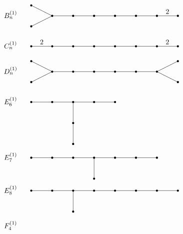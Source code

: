 \documentclass[letterpaper]{amsart}
\numberwithin{equation}{section}
\theoremstyle{definition}
\begin{document}
\begin{figure}[ht] 
\[ 
\begin{array}{ccl} 
B_n^{(1)} 
&& 
\setlength{\unitlength}{1.5pt} 
\begin{picture}(140,15)(0,-2) 
\put(20,0){\line(1,0){120}} 
\put(0,10){\line(2,-1){20}} 
\put(0,-10){\line(2,1){20}} 
\multiput(20,0)(20,0){7}{\circle*{2}} 
\put(0,10){\circle*{2}} 
\put(0,-10){\circle*{2}} 
\put(130,4){\makebox(0,0){$2$}} 
\end{picture} 
\\[.2in] 
C_n^{(1)}%
&& 
\setlength{\unitlength}{1.5pt} 
\begin{picture}(140,17)(0,-2) 
\put(0,0){\line(1,0){140}} 
\multiput(0,0)(20,0){8}{\circle*{2}} 
\put(10,4){\makebox(0,0){$2$}} 
\put(130,4){\makebox(0,0){$2$}} 
\end{picture} 
\\[.1in] 
D_n^{(1)} 
&& 
\setlength{\unitlength}{1.5pt} 
\begin{picture}(140,17)(0,-2) 
\put(20,0){\line(1,0){100}} 
\put(0,10){\line(2,-1){20}} 
\put(0,-10){\line(2,1){20}} 
\put(120,0){\line(2,-1){20}} 
\put(120,0){\line(2,1){20}} 
\multiput(20,0)(20,0){6}{\circle*{2}} 
\put(0,10){\circle*{2}} 
\put(0,-10){\circle*{2}} 
\put(140,10){\circle*{2}} 
\put(140,-10){\circle*{2}} 
\end{picture} 
\\[.2in] 
E_6^{(1)} 
&& 
\setlength{\unitlength}{1.5pt} 
\begin{picture}(140,17)(0,-2) 
\put(0,0){\line(1,0){80}} 
\put(40,0){\line(0,-1){40}} 
\put(40,-20){\circle*{2}} 
\put(40,-40){\circle*{2}} 
\multiput(0,0)(20,0){5}{\circle*{2}} 
\end{picture} 
\\[.7in] 
E_7^{(1)} 
&& 
\setlength{\unitlength}{1.5pt} 
\begin{picture}(140,17)(0,-2) 
\put(0,0){\line(1,0){120}} 
\put(60,0){\line(0,-1){20}} 
\put(60,-20){\circle*{2}} 
\multiput(0,0)(20,0){7}{\circle*{2}} 
\end{picture} 
\\[.25in] 
E_8^{(1)} 
&& 
\setlength{\unitlength}{1.5pt} 
\begin{picture}(140,17)(0,-2) 
\put(0,0){\line(1,0){140}} 
\put(40,0){\line(0,-1){20}} 
\put(40,-20){\circle*{2}} 
\multiput(0,0)(20,0){8}{\circle*{2}} 
\end{picture} 
\\[.3in] 
F_4^{(1)} 
&& 
\setlength{\unitlength}{1.5pt} 
\begin{picture}(140,17)(0,-2) 

\end{picture}
\end{array}\]
\end{figure}
\end{document}
